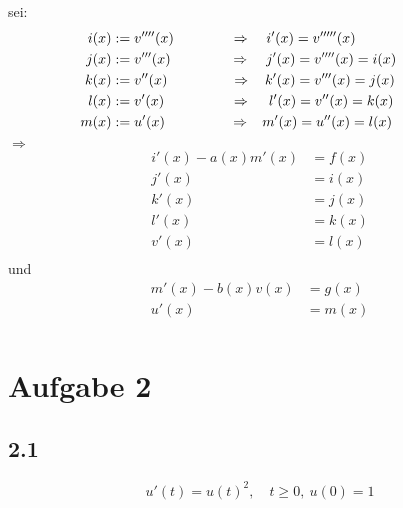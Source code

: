 \documentclass[10pt,oneside,a4paper]{scrartcl}
\begin{document}
        sei:
        \begin{align*}
            i(x) &:= v''''(x) \hspace{4.0em} \Rightarrow &i'(x) = v'''''(x)
            \hspace{5.9em}\\
            j(x) &:= v'''(x) \hspace{4.2em} \Rightarrow &j'(x) = v''''(x) = i(x)
            \hspace{3em}\\
            k(x) &:= v''(x) \hspace{4.5em} \Rightarrow &k'(x) = v'''(x) = j(x)
            \hspace{3.1em}\\
            l(x) &:= v'(x) \hspace{4.7em} \Rightarrow &l'(x) = v''(x) = k(x)
            \hspace{3.2em}\\
            m(x) &:= u'(x) \hspace{4.6em} \Rightarrow &m'(x) = u''(x) = l(x)
            \hspace{3.3em}\\
        \end{align*}
        $\Rightarrow$
        \begin{align*}
          i'(x) - a(x)m'(x) & = f(x)\\
          j'(x) & = i(x)\\
          k'(x) & = j(x)\\
          l'(x) & = k(x)\\
          v'(x) & = l(x)\\
        \end{align*}
        und
        \begin{align*}
          m'(x) - b(x)v(x) & = g(x)\\
          u'(x) & = m(x)\\
        \end{align*}

	\section*{Aufgabe 2}

  		\subsection*{2.1}

		\begin{equation*}
			u'(t) = u(t)^2,\quad t \geq 0, \ u(0) = 1
		\end{equation*}
		
\end{document}
